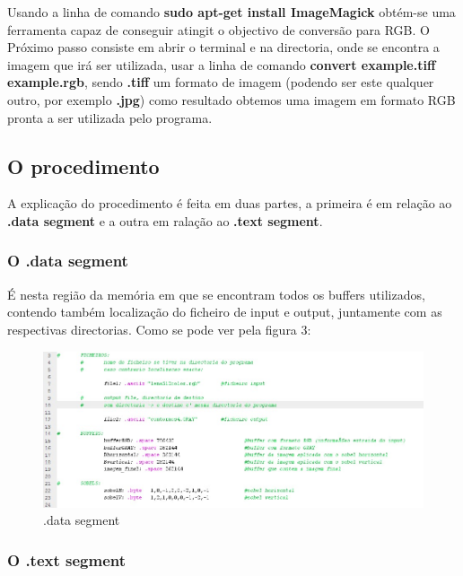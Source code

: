 \documentclass[a4paper,11pt]{article}
\begin{document}
\indent Usando a linha de comando {\bf sudo apt-get install ImageMagick} obtém-se uma ferramenta capaz de conseguir atingit o objectivo de conversão para RGB.
O Próximo passo consiste em abrir o terminal e na directoria, onde se encontra a imagem que irá ser utilizada, usar a linha de comando {\bf convert example.tiff example.rgb}, sendo {\bf .tiff} um formato de imagem (podendo ser este qualquer outro, por exemplo {\bf .jpg}) como resultado obtemos uma imagem em formato RGB pronta a ser utilizada pelo programa.

\newpage

\subsection{O procedimento}

\indent A explicação do procedimento é feita em duas partes, a primeira é em relação ao {\bf .data segment} e a outra em ralação ao {\bf .text segment}.

\subsubsection{O .data segment}

\indent É nesta região da memória em que se encontram todos os buffers utilizados, contendo também localização do ficheiro de input e output, juntamente com as respectivas directorias. Como se pode ver pela figura 3:
\newline

\begin{figure}[ht!]
\centering
\includegraphics[width=150mm]{imagem}
\caption{.data segment}
\label{overflow}
\end{figure}

\newpage

\subsubsection{O .text segment}
\end{document}
